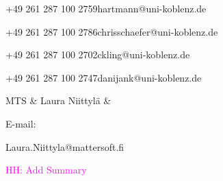 \documentclass[external]{20120615_deliverable_template_ukob}
\theoremstyle{definition}
\newcommand{\todo}[2]{\textcolor{magenta}{#1: #2}}
\begin{document}
\begin{LGhistory}

\end{LGhistory}


\newcommand{\LGaddauthorNoPhone}[3]{\hline  #1 &  #2 & %
   \parbox{3em}{E-mail:} \small #3 \\
}

\begin{LGauthors}

%
{+49 261 287 100 2759}{\small hartmann@uni-koblenz.de}

%
{+49 261 287 100 2786}{\small chrisschaefer@uni-koblenz.de}

%
{+49 261 287 100 2702}{\small ckling@uni-koblenz.de}

%
{+49 261 287 100 2747}{\small danijank@uni-koblenz.de}

\LGaddauthorNoPhone{MTS}{Laura Niittyl\"a}%
{\small Laura.Niittyla@mattersoft.fi}

\end{LGauthors}



\begin{LGExecutiveSummary}
  \vspace{10pt} 

\todo{HH}{Add Summary}

\end{LGExecutiveSummary}
\end{document}
